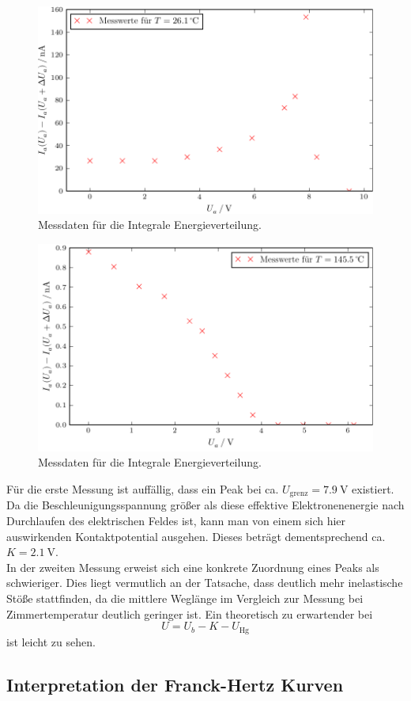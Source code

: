 


\begin{figure}[H]
  \centering
  \includegraphics{build/aufgabenteil_a_plot.pdf}
  \caption{Messdaten für die Integrale Energieverteilung.}
  \label{fig:plot1}
\end{figure}

\begin{figure}[H]
  \centering
  \includegraphics{build/aufgabenteil_a_plot_2.pdf}
  \caption{Messdaten für die Integrale Energieverteilung.}
  \label{fig:plot2}
\end{figure}

Für die erste Messung ist auffällig, dass ein Peak bei ca. $U_{\text{grenz}} = \SI{7.9}{\volt}$ existiert.
Da die Beschleunigungsspannung größer als diese effektive Elektronenenergie nach Durchlaufen des elektrischen Feldes ist, kann man von einem sich hier auswirkenden Kontaktpotential ausgehen.
Dieses beträgt dementsprechend ca. $K = \SI{2.1}{\volt}$.\\
In der zweiten Messung erweist sich eine konkrete Zuordnung eines Peaks als schwieriger.
Dies liegt vermutlich an der Tatsache, dass deutlich mehr inelastische Stöße stattfinden, da die mittlere Weglänge im Vergleich zur Messung bei Zimmertemperatur deutlich geringer ist.
Ein theoretisch zu erwartender bei
\begin{equation}
  U = U_b - K - U_{\text{Hg}}
\end{equation}
ist leicht zu sehen. %

\subsection{Interpretation der Franck-Hertz Kurven}
